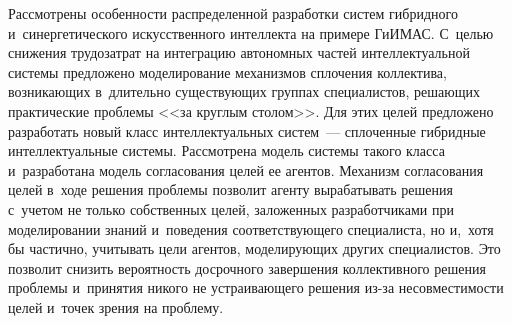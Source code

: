 \begin{multicols}{2}
  Рассмотрены особенности распределенной разработки систем гибридного 
  и~синергетического искусственного интеллекта на примере \mbox{ГиИМАС}. С~целью снижения трудозатрат на 
интеграцию автономных час\-тей интеллектуальной сис\-те\-мы предложено 
моделирование механизмов сплочения коллектива, воз\-ни\-ка\-ющих в~длительно 
существующих группах специалистов, решающих практические проб\-ле\-мы <<за 
круглым столом>>. Для этих целей предложено разработать новый класс 
интеллектуальных сис\-тем~--- сплоченные гибридные интеллектуальные 
системы. Рассмотрена модель системы такого класса и~разработана модель 
согласования целей ее агентов. Механизм согласования целей в~ходе решения 
проблемы позволит агенту вырабатывать решения с~учетом не только 
собственных целей, заложенных разработчиками при моделировании знаний 
и~поведения соответствующего специалиста, но и,~хотя бы час\-тич\-но, учитывать 
цели агентов, мо\-де\-ли\-ру\-ющих других специалистов. Это позволит снизить 
вероятность досрочного завершения коллективного решения проб\-ле\-мы 
и~принятия никого не устраивающего решения из-за несовместимости целей 
и~точек зрения на проблему. 
  

\end{multicols}
